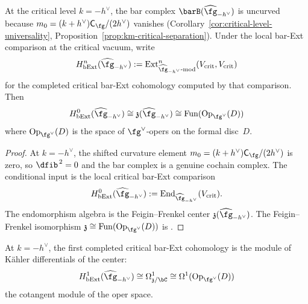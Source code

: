 \begin{theorem}\label{thm:oper-bar-h0}
At the critical level $k = -h^\vee$, the bar complex
$\barB(\widehat{\fg}_{-h^\vee})$ is uncurved because
$m_0=(k+h^\vee)\mathsf C_{\fg}/(2h^\vee)$ vanishes
(Corollary~\ref{cor:critical-level-universality},
Proposition~\ref{prop:km-critical-separation}).  Under the local
bar-Ext comparison at the critical vacuum, write
\[
H^n_{\mathrm{bExt}}(\widehat{\fg}_{-h^\vee})
:=
\mathrm{Ext}^n_{\widehat{\fg}_{-h^\vee}\text{-mod}}
(V_{\mathrm{crit}},V_{\mathrm{crit}})
\]
for the completed critical bar-Ext cohomology computed by that
comparison. Then
\begin{equation}\label{eq:bar-oper}
H^0_{\mathrm{bExt}}(\widehat{\fg}_{-h^\vee})
\cong \mathfrak{z}(\widehat{\fg}_{-h^\vee})
\cong \mathrm{Fun}(\mathrm{Op}_{\fg^\vee}(D))
\end{equation}
where $\mathrm{Op}_{\fg^\vee}(D)$ is the space of $\fg^\vee$-opers
on the formal disc~$D$.
\end{theorem}

\begin{proof}
At $k = -h^\vee$, the shifted curvature element
$m_0=(k+h^\vee)\mathsf C_{\fg}/(2h^\vee)$ is zero, so
$\dfib^{\,2}=0$ and the bar complex is a genuine cochain complex.
The conditional input is the local critical bar-Ext comparison
\[
H^0_{\mathrm{bExt}}(\widehat{\fg}_{-h^\vee})
:=
\operatorname{End}_{\widehat{\fg}_{-h^\vee}}(V_{\mathrm{crit}}).
\]
The endomorphism algebra is the Feigin--Frenkel center
$\mathfrak{z}(\widehat{\fg}_{-h^\vee})$. The Feigin--Frenkel
isomorphism
$\mathfrak{z} \cong \mathrm{Fun}(\mathrm{Op}_{\fg^\vee}(D))$ is
\ClaimStatusProvedElsewhere{} \cite{Feigin-Frenkel, FG06}.
\end{proof}

\begin{proposition}\label{prop:oper-bar-h1}
At $k = -h^\vee$, the first completed critical bar-Ext cohomology is
the module of K\"ahler differentials of the center:
\begin{equation}\label{eq:bar-oper-h1}
H^1_{\mathrm{bExt}}(\widehat{\fg}_{-h^\vee})
\cong \Omega^1_{\mathfrak{z}/\bC}
\cong \Omega^1(\mathrm{Op}_{\fg^\vee}(D))
\end{equation}
the cotangent module of the oper space.
\end{proposition}

